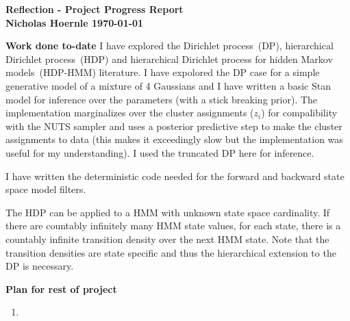 \documentclass[twoside]{article}
\begin{document}
\textbf{Reflection - Project Progress Report}\\
\textbf{Nicholas Hoernle \hfill \today}

\textbf{Work done to-date}
I have explored the Dirichlet process~(DP), hierarchical Dirichlet process~(HDP) and hierarchical Dirichlet process for hidden Markov models~(HDP-HMM) literature. I have expolored the DP case for a simple generative model of a mixture of 4 Gaussians and I have written a basic Stan model for inference over the parameters (with a stick breaking prior). The implementation marginalizes over the cluster assignments ($z_i$) for compalibility with the NUTS sampler and uses a posterior predictive step to make the cluster assignments to data (this makes it exceedingly slow but the implementation was useful for my understanding). I used the truncated DP here for inference.

I have written the deterministic code needed for the forward and backward state space model filters.

The HDP can be applied to a HMM with unknown state space cardinality. If there are countably infinitely many HMM state values, for each state, there is a countably infinite transition density over the next HMM state. Note that the transition densities are state specific and thus the hierarchical extension to the DP is necessary. 

\textbf{Plan for rest of project}
\begin{enumerate}
  \item
\end{enumerate}
\end{document}
